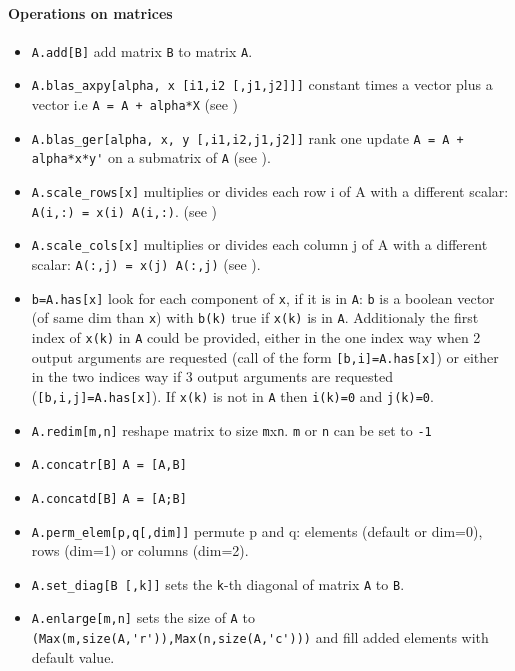 \paragraph{Operations on matrices}
\begin{itemize}
\item \verb+A.add[B]+  add matrix \verb+B+ to matrix \verb+A+.
\item \verb+A.blas_axpy[alpha, x [i1,i2 [,j1,j2]]]+ constant times a vector plus a vector i.e \verb!A = A + alpha*X!  (see )
\item \verb+A.blas_ger[alpha, x, y [,i1,i2,j1,j2]]+  rank one update \verb!A = A + alpha*x*y'!
  on a submatrix of \verb+A+ (see ).
\item \verb+A.scale_rows[x]+ multiplies or divides each row i of A with a different scalar:
  \verb+A(i,:) = x(i) A(i,:)+.  (see ) 
\item \verb+A.scale_cols[x]+ multiplies or divides each column j of A with a different scalar:
  \verb+A(:,j) = x(j) A(:,j)+ (see ).
\item \verb+b=A.has[x]+ look for each component of \verb+x+, 
  if it is in \verb+A+: \verb+b+ is a boolean vector 
  (of same dim than \verb+x+) with \verb+b(k)+ true if
  \verb+x(k)+ is in \verb+A+. Additionaly the first index of
  \verb+x(k)+ in \verb+A+ could be provided, either in the one index way
  when 2 output arguments are requested (call of the form \verb+[b,i]=A.has[x]+) or
  either in the two indices way if 3 output arguments are requested
  (\verb+[b,i,j]=A.has[x]+). If \verb+x(k)+ is not in \verb+A+ then
  \verb+i(k)=0+ and \verb+j(k)=0+.
\end{itemize}
\begin{itemize}
\item \verb+A.redim[m,n]+ reshape matrix to size \verb+m+x\verb+n+. \verb+m+ or \verb+n+ can be set to \verb+-1+ 
\item \verb+A.concatr[B]+ \verb+A = [A,B]+
\item \verb+A.concatd[B]+ \verb+A = [A;B]+
\item \verb+A.perm_elem[p,q[,dim]]+ permute p and q: elements
  (default or dim=0), rows (dim=1) or columns (dim=2).
\item \verb+A.set_diag[B [,k]]+ sets the \verb+k+-th diagonal of matrix \verb+A+ to \verb+B+.
\item \verb+A.enlarge[m,n]+ sets the size of \verb+A+ to \verb+(Max(m,size(A,'r')),Max(n,size(A,'c')))+ and fill 
  added elements with default value.
\end{itemize}


